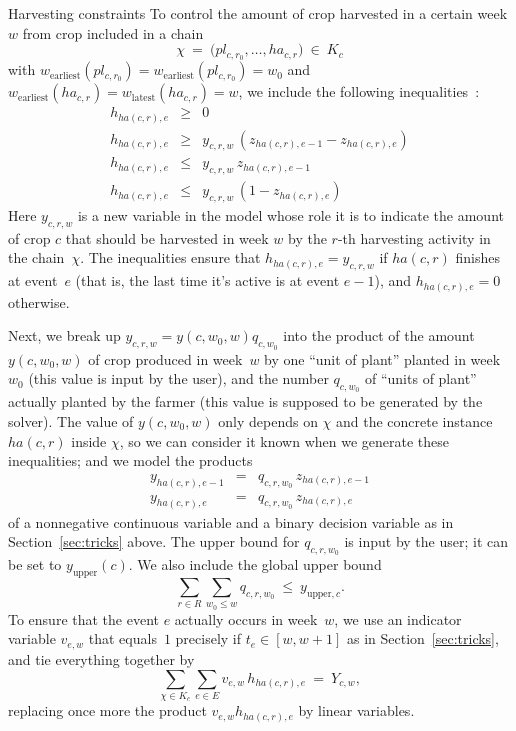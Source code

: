 \documentclass[11pt,reqno]{amsart}
\numberwithin{equation}{section}
\begin{document}
\begin{mydesc}
\item[Harvesting constraints] To control the amount of crop harvested in a certain week
  $w$  from
  crop included in a chain 
  \[
       \chi \ = \ \big(pl_{c,r_0},\dots,ha_{c,r}\big)
       \ \in \ K_c
  \]
  with $w_{\text{earliest}}(pl_{c,r_0}) = w_{\text{earliest}}(pl_{c,r_0}) = w_0$ and
  $w_{\text{earliest}}(ha_{c,r})= w_{\text{latest}}(ha_{c,r})=w$, we include the
  following inequalities~\cite[Section~3.3]{artigues-etal11}:
  \begin{eqnarray}
    h_{ha(c,r),e} &\ge& 0 \\
    h_{ha(c,r),e} &\ge& y_{c,r,w}\, (z_{ha(c,r),e-1}-z_{ha(c,r),e})\\
    h_{ha(c,r),e} &\le& y_{c,r,w}\, z_{ha(c,r),e-1}\\    
    h_{ha(c,r),e} &\le& y_{c,r,w}\, (1-z_{ha(c,r),e})
  \end{eqnarray}
  Here $y_{c,r,w}$ is a new variable in the model whose role it is to indicate the amount
  of crop $c$ that should be harvested in week $w$ by the $r$-th harvesting activity in
  the chain~$\chi$.  The inequalities ensure that $h_{ha(c,r),e}=y_{c,r,w}$ if $ha(c,r)$
  finishes at event~$e$ (that is, the last time it's active is at event $e-1$), and
  $h_{ha(c,r),e}=0$ otherwise. 

  Next, we break up $y_{c,r,w}=y(c,w_0,w)q_{c,w_0}$ into the product of the amount
  $y(c,w_0,w)$ of crop produced in week~$w$ by one ``unit of plant'' planted in week~$w_0$
  (this value is input by the user), and the number $q_{c,w_0}$ of ``units of plant''
  actually planted by the farmer (this value is supposed to be generated by the
  solver). The value of $y(c,w_0,w)$ only depends on $\chi$ and the concrete instance
  $ha(c,r)$ inside $\chi$, so we can consider it known when we generate these
  inequalities; and we model the products 
  \begin{eqnarray*}
    y_{ha(c,r),e-1} &=& q_{c,r,w_0} \, z_{ha(c,r),e-1}\\
    y_{ha(c,r),e} &=& q_{c,r,w_0} \, z_{ha(c,r),e}
  \end{eqnarray*}
  of a nonnegative continuous variable and a binary decision variable as in
  Section~\ref{sec:tricks} above. The upper bound for $q_{c,r,w_0}$ is input by the user;
  it can be set to $y_{\text{upper}}(c)$. We also include the global upper bound
  \[
     \sum_{r\in R} \sum_{w_0\le w} q_{c,r,w_0} \ \le \ y_{\text{upper},c}.
  \]
  To ensure that the event $e$ actually occurs in week~$w$, we use an indicator
  variable $v_{e,w}$ that equals~$1$ precisely if $t_e\in[w,w+1]$ as in
  Section~\ref{sec:tricks}, and tie everything together by
  \[
     \sum_{\chi\in K_c} \sum_{e\in E} v_{e,w} \,h_{ha(c,r),e} \ = \ Y_{c,w},
  \]
  replacing once more the product $v_{e,w} h_{ha(c,r),e}$ by  linear variables.


\end{mydesc}
\end{document}
